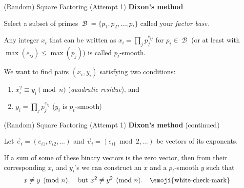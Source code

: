 \documentclass[11pt,aspectratio=1610,xcolor=dvipsnames]{beamer}
\DeclareMathOperator{\calB}{\mathcal{B}}
\newcommand{\emphcolor}{Red}
\newcommand{\Emph}[1]{{\color{\emphcolor}\emph{#1}}}
\begin{document}
\begin{frame}{(Random) Square Factoring}
    (Attempt 1) \textbf{Dixon's method}

    Select a subset of primes
    $\calB = \{ p_1, p_2, \ldots, p_t \}$
    called your \Emph{factor base}.

    Any integer $x_i$ that can be written as $x_i = \prod_j p_j^{e_{ij}}$
    for $p_i\in\calB$ (or at least with $\max(e_{ij})\le\max(p_j)$)
    is called $p_t$-smooth. \pause

    We want to find pairs $(x_i,y_i)$ satisfying
    {\color{Orange} two conditions}:
    \begin{enumerate}
        \item $x_i^2 \equiv y_i\pmod n$ (\Emph{quadratic residue}), and
        \item $y_i = \prod_j p_j^{e_{ij}}$ ($y_i$ is $p_t$-smooth)
    \end{enumerate}
\end{frame}

\begin{frame}{(Random) Square Factoring}
    (Attempt 1) \textbf{Dixon's method} (continued)

    Let $\vec e_i=(e_{i1},e_{i2},\ldots)$
    and $\vec v_i=(e_{i1}\bmod 2,\ldots)$ be vectors of its exponents.

    {%
        \color{Blue}
        If a sum of some of these binary vectors is the zero vector,
        then from their corresponding $x_i$ and $y_i$'s we can construct an
        $x$ and a $p_t$-smooth $y$ such that
        \[
            x\not\equiv y\pmod n,\quad\text{but }
            x^2\not\equiv y^2\pmod n.
            \quad \text{\emoji{white-check-mark}}
        \]
    }
\end{frame}
\end{document}
